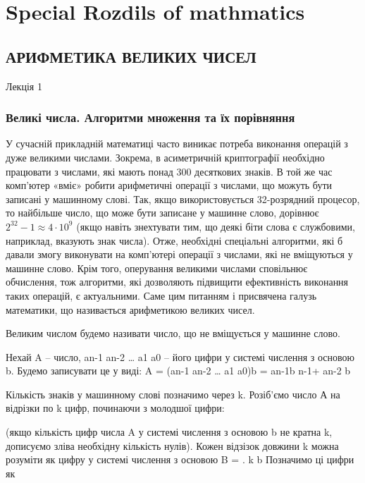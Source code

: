 \chapter{Special Rozdils of mathmatics}

\section{АРИФМЕТИКА ВЕЛИКИХ ЧИСЕЛ}

Лекція 1

\subsection{Великі числа. Алгоритми множення та їх порівняння}

У сучасній прикладній математиці часто виникає потреба виконання
операцій з дуже великими числами. Зокрема, в асиметричній криптографії
необхідно працювати з числами, які мають понад 300 десяткових знаків. В той
же час комп’ютер «вміє» робити арифметичні операції з числами, що можуть
бути записані у машинному слові. Так, якщо використовується 32-розрядний
процесор, то найбільше число, що може бути записане у машинне слово,
дорівнює $2^{32} - 1 \approx 4 \cdot 10^9$
(якщо навіть знехтувати тим, що деякі біти слова є
службовими, наприклад, вказують знак числа). Отже, необхідні спеціальні
алгоритми, які б давали змогу виконувати на комп’ютері операції з числами,
які не вміщуються у машинне слово. Крім того, оперування великими числами
сповільнює обчислення, тож алгоритми, які дозволяють підвищити
ефективність виконання таких операцій, є актуальними. Саме цим питанням і
присвячена галузь математики, що називається арифметикою великих чисел.

Великим числом будемо називати число, що не вміщується у машинне
слово.

Нехай A – число, an-1 an-2 … a1 a0 – його цифри у системі числення з
основою b. Будемо записувати це у виді:
A = (an-1 an-2 … a1 a0)b = an-1b
n-1+ an-2 b


Кількість знаків у машинному слові позначимо через k. Розіб’ємо число А на
відрізки по k цифр, починаючи з молодшої цифри:



(якщо кількість цифр числа A у системі числення з основою b не кратна k,
дописуємо зліва необхідну кількість нулів). Кожен відзізок довжини k можна
розуміти як цифру у системі числення з основою B = .
k
b
 Позначимо ці цифри
як

